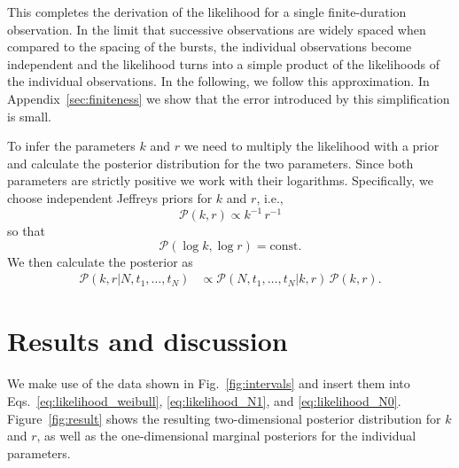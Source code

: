 \documentclass[fleqn,usenatbib]{mnras}
\newcommand{\new}[1]{#1}
\begin{document}
This completes the derivation of the likelihood for a single finite-duration observation. In the limit that successive observations are widely spaced when compared to the spacing of the bursts, the individual observations become independent and the likelihood turns into a simple product of the likelihoods of the individual observations. In the following, we follow this approximation. In Appendix~\ref{sec:finiteness} we show that the error introduced by this simplification is small.

To infer the parameters $k$ and $r$ we need to multiply the likelihood with a prior and calculate the posterior distribution for the two parameters. Since both parameters are strictly positive we work with their logarithms. Specifically, we choose independent Jeffreys priors for $k$ and $r$, i.e.,
\begin{equation}
	\mathcal{P}(k,r) \propto k^{-1} \, r^{-1}
\end{equation}
\new{so that
\begin{equation}
	\mathcal{P}(\log k,\log r) = \mathrm{const}.
\end{equation}}
We then calculate the posterior as
\begin{align}
	\mathcal{P}(k,r|N,t_1,\dots,t_N) &\propto \mathcal{P}(N,t_1,\dots,t_N|k,r)\,\mathcal{P}(k,r).
\end{align}


\section{Results and discussion}
\label{sec:results}

We make use of the data shown in Fig.~\ref{fig:intervals} and insert them into Eqs.~\eqref{eq:likelihood_weibull}, \eqref{eq:likelihood_N1}, and \eqref{eq:likelihood_N0}. Figure~\ref{fig:result} shows the resulting two-dimensional posterior distribution for $k$ and $r$, as well as the one-dimensional marginal posteriors for the individual parameters.
\end{document}
